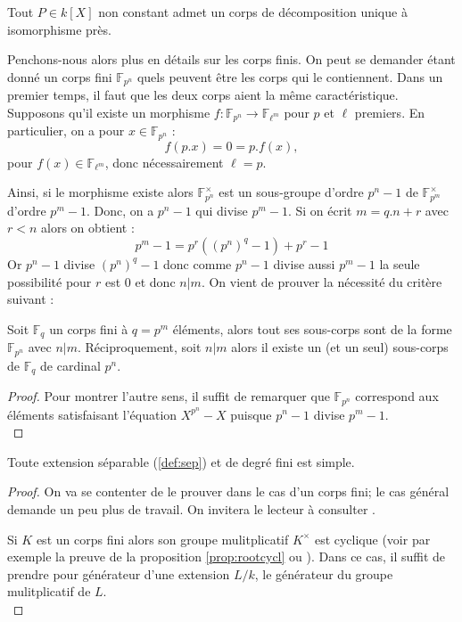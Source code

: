\documentclass[a4paper]{article} %
\numberwithin{section}{part}
\numberwithin{equation}{section}
\newcommand\GF[1]{\mathbb{F}_{#1}}
\begin{document}
\begin{thm}
\label{cor:dec}
Tout $P\in k[X]$ non constant admet un corps de décomposition unique à 
isomorphisme près.
\end{thm}

Penchons-nous alors plus en détails sur les corps finis. On peut se demander
étant donné un corps fini $\GF{p^n}$ quels peuvent être les corps qui le
contiennent. Dans un premier temps, il faut que les deux corps aient la même
caractéristique. Supposons qu'il existe un morphisme $f : \GF{p^n} \to 
\GF{\ell^m}$ pour $p$ et $\ell$ premiers. En particulier, on a pour 
$x\in\GF{p^n}$ :
\begin{equation}
f(p.x) = 0 = p.f(x),
\end{equation}
pour $f(x)\in\GF{\ell^m}$, donc nécessairement $\ell = p$.\par
Ainsi, si le morphisme existe alors $\GF{p^n}^{\times}$ est un sous-groupe
d'ordre $p^n - 1$ de $\GF{p^m}^{\times}$ d'ordre $p^m - 1$. Donc, on a $p^n - 1$
qui divise $p^m - 1$. Si on écrit $m = q.n + r$ avec $r < n$ alors on obtient :
\[p^m - 1 = p^r((p^n)^q - 1) + p^r - 1\]
Or $p^n - 1$ divise $(p^n)^q - 1$ donc comme $p^n - 1$ divise aussi $p^m - 1$ la
seule possibilité pour $r$ est $0$ et donc $n|m$. On vient de prouver la
nécessité du critère suivant :

\begin{prop}
Soit $\GF{q}$ un corps fini à $q = p^m$ éléments, alors tout ses sous-corps sont
de la forme $\GF{p^n}$ avec $n|m$. Réciproquement, soit $n|m$ alors il existe un
(et un seul) sous-corps de $\GF{q}$ de cardinal $p^n$.
\end{prop}
\begin{proof}
Pour montrer l'autre sens, il suffit de remarquer que $\GF{p^n}$ correspond aux
éléments satisfaisant l'équation $X^{p^n} - X$ puisque $p^n - 1$ divise $p^m -
1$.\\
\end{proof}

\begin{thm}
\label{th:elemprim}
Toute extension séparable (\ref{def:sep}) et de degré fini est simple.
\end{thm}
\begin{proof}
On va se contenter de le prouver dans le cas d'un corps fini; le cas général
demande un peu plus de travail. On invitera le lecteur à consulter
\cite[p.~87]{Esc}.\par
Si $K$ est un corps fini alors son groupe mulitplicatif $K^{\times}$ est
cyclique (voir par exemple la preuve de la proposition \ref{prop:rootcycl} ou
\cite[p.~50]{LiNi1}). Dans ce cas, il suffit de prendre pour générateur d'une
extension $L/k$, le générateur du groupe mulitplicatif de $L$.\\
\end{proof}
\end{document}
